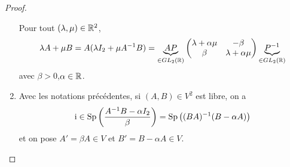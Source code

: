 \documentclass[12pt]{article}
\begin{document}
\begin{proof}
\begin{enumerate}
		Pour tout $(\lambda,\mu)\in\mathbb{R}^{2}$, 
		\begin{equation}
			\lambda A+\mu B=A(\lambda I_{2}+\mu A^{-1}B)=\underbrace{AP}_{\in GL_{2}(\mathbb{R})}\begin{pmatrix}
				\lambda+\alpha\mu&-\beta\\\beta&\lambda+\alpha\mu
			\end{pmatrix}\underbrace{P^{-1}}_{\in GL_{2}(\mathbb{R})}
		\end{equation}
		avec $\beta>0$,$\alpha\in\mathbb{R}$.

		\item Avec les notations précédentes, si $(A,B)\in V^{2}$ est libre, on a 
		\begin{equation}
			\mathrm{i}\in\operatorname{Sp}\left(\frac{A^{-1}B-\alpha I_{2}}{\beta}\right)=\operatorname{Sp}\left((BA)^{-1}(B-\alpha A)\right)
		\end{equation}
		et on pose $A'=\beta A\in V$ et $B'=B-\alpha A\in V$.
	\end{enumerate}
\end{proof}
\end{document}
